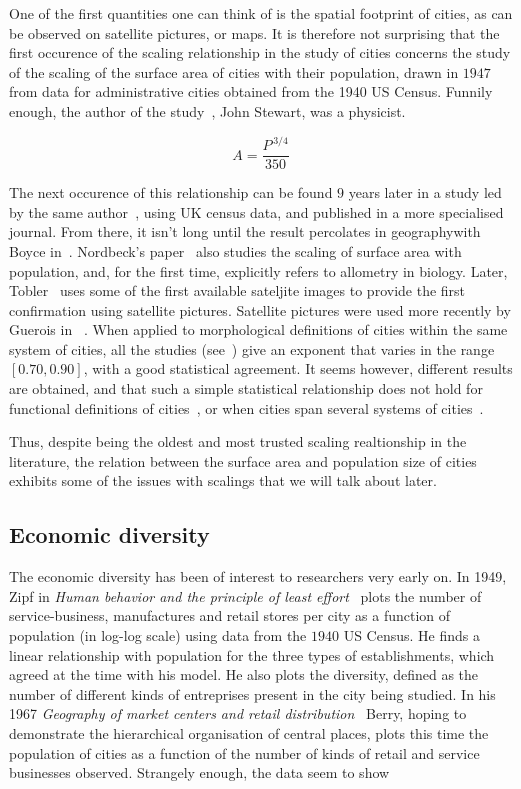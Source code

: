 One of the first quantities one can think of is the spatial footprint of cities,
as can be observed on satellite pictures, or maps. It is therefore not
surprising that the first occurence of the scaling relationship in the study of
cities concerns the study of the scaling of the surface area of cities with
their population, drawn in $1947$ from data for administrative cities obtained
from the 1940 US Census.  Funnily enough, the author of the
study~\cite{Stewart:1947}, John Stewart, was a physicist.

\begin{equation}
    A = \frac{P^{\,3/4}}{350}
\end{equation}

The next occurence of this relationship can be found $9$ years later in a study
led by the same author~\cite{Stewart:1958}, using UK census data, and published
in a more specialised journal. From there, it isn't long until the result
percolates in geographywith Boyce in~\cite{Boyce:1963}.  Nordbeck's
paper~\cite{Nordbeck:1965} also studies the scaling of surface area with
population, and, for the first time, explicitly refers to allometry in biology.
Later, Tobler~\cite{Tobler:1969} uses some of the first available sateljite
images to provide the first confirmation using satellite pictures. Satellite
pictures were used more recently by Guerois in ~\cite{Guerois:2003}. When
applied to morphological definitions of cities within the same system of cities,
all the studies (see~\cite{Batty:2011}) give an exponent that varies in the
range $[0.70, 0.90]$, with a good statistical agreement. It seems however,
different results are obtained, and that such a simple statistical relationship
does not hold for functional definitions of cities~\cite{Batty:2011}, or when
cities span several systems of cities~\cite{Fuller:2009}.

Thus, despite being the oldest and most trusted scaling realtionship in the
literature, the relation between the surface area and population size of cities
exhibits some of the issues with scalings that we will talk about later.

\subsection{Economic diversity}
\label{sub:economic_diversity}

The economic diversity has been of interest to researchers very early on. In
1949, Zipf in \emph{Human behavior and the principle of least
effort}~\cite{Zipf:1949} plots the number of service-business, manufactures and
retail stores per city as a function of population (in log-log scale) using data
from the $1940$ US Census. He finds a linear relationship with population for
the three types of establishments, which agreed at the time with his model. He
also plots the diversity, defined as the number of different kinds of
entreprises present in the city being studied. In his 1967 \emph{Geography of
market centers and retail distribution}~\cite{Berry:1967} Berry, hoping to
demonstrate the hierarchical organisation of central places, plots this time
the population of cities as a function of the number of kinds of retail and
service businesses observed. Strangely enough, the data seem to show

